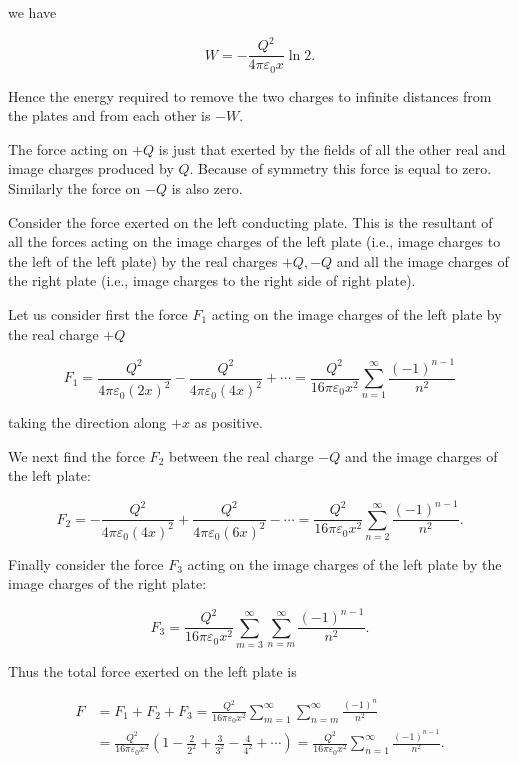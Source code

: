 \documentclass[10pt]{article}
\begin{document}
we have

$$
W=-\frac{Q^{2}}{4 \pi \varepsilon_{0} x} \ln 2 .
$$

Hence the energy required to remove the two charges to infinite distances from the plates and from each other is $-W$.

 The force acting on $+Q$ is just that exerted by the fields of all the other real and image charges produced by $Q$. Because of symmetry this force is equal to zero. Similarly the force on $-Q$ is also zero.

 Consider the force exerted on the left conducting plate. This is the resultant of all the forces acting on the image charges of the left plate (i.e., image charges to the left of the left plate) by the real charges $+Q,-Q$ and all the image charges of the right plate (i.e., image charges to the right side of right plate).

Let us consider first the force $F_{1}$ acting on the image charges of the left plate by the real charge $+Q$

$$
F_{1}=\frac{Q^{2}}{4 \pi \varepsilon_{0}(2 x)^{2}}-\frac{Q^{2}}{4 \pi \varepsilon_{0}(4 x)^{2}}+\cdots=\frac{Q^{2}}{16 \pi \varepsilon_{0} x^{2}} \sum_{n=1}^{\infty} \frac{(-1)^{n-1}}{n^{2}}
$$

taking the direction along $+x$ as positive.

We next find the force $F_{2}$ between the real charge $-Q$ and the image charges of the left plate:

$$
F_{2}=-\frac{Q^{2}}{4 \pi \varepsilon_{0}(4 x)^{2}}+\frac{Q^{2}}{4 \pi \varepsilon_{0}(6 x)^{2}}-\cdots=\frac{Q^{2}}{16 \pi \varepsilon_{0} x^{2}} \sum_{n=2}^{\infty} \frac{(-1)^{n-1}}{n^{2}} .
$$

Finally consider the force $F_{3}$ acting on the image charges of the left plate by the image charges of the right plate:

$$
F_{3}=\frac{Q^{2}}{16 \pi \varepsilon_{0} x^{2}} \sum_{m=3}^{\infty} \sum_{n=m}^{\infty} \frac{(-1)^{n-1}}{n^{2}} .
$$

Thus the total force exerted on the left plate is

$$
\begin{aligned}
F &=F_{1}+F_{2}+F_{3}=\frac{Q^{2}}{16 \pi \varepsilon_{0} x^{2}} \sum_{m=1}^{\infty} \sum_{n=m}^{\infty} \frac{(-1)^{n}}{n^{2}} \\
&=\frac{Q^{2}}{16 \pi \varepsilon_{0} x^{2}}\left(1-\frac{2}{2^{2}}+\frac{3}{3^{2}}-\frac{4}{4^{2}}+\cdots\right)=\frac{Q^{2}}{16 \pi \varepsilon_{0} x^{2}} \sum_{n=1}^{\infty} \frac{(-1)^{n-1}}{n^{2}} .
\end{aligned}
$$
\end{document}
